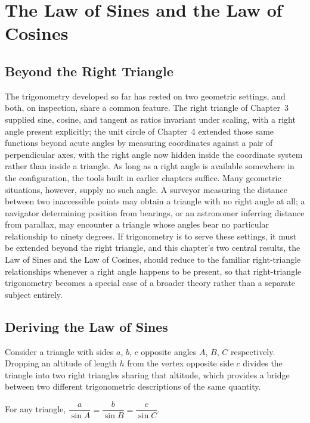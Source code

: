 \chapter{The Law of Sines and the Law of Cosines}
\label{ch:ch12-laws-sines-cosines}

\section{Beyond the Right Triangle}

The trigonometry developed so far has rested on two geometric settings, and
both, on inspection, share a common feature. The right triangle of
Chapter~3 supplied sine, cosine, and tangent as ratios invariant under
scaling, with a right angle present explicitly; the unit circle of
Chapter~4 extended those same functions beyond acute angles by measuring
coordinates against a pair of perpendicular axes, with the right angle now
hidden inside the coordinate system rather than inside a triangle. As long
as a right angle is available somewhere in the configuration, the tools
built in earlier chapters suffice. Many geometric situations, however,
supply no such angle. A surveyor measuring the distance between two
inaccessible points may obtain a triangle with no right angle at all; a
navigator determining position from bearings, or an astronomer inferring
distance from parallax, may encounter a triangle whose angles bear no
particular relationship to ninety degrees. If trigonometry is to serve
these settings, it must be extended beyond the right triangle, and this
chapter's two central results, the Law of Sines and the Law of Cosines,
should reduce to the familiar right-triangle relationships whenever a
right angle happens to be present, so that right-triangle trigonometry
becomes a special case of a broader theory rather than a separate subject
entirely.

\section{Deriving the Law of Sines}

Consider a triangle with sides $a$, $b$, $c$ opposite angles $A$, $B$,
$C$ respectively. Dropping an altitude of length $h$ from the vertex
opposite side $c$ divides the triangle into two right triangles sharing
that altitude, which provides a bridge between two different
trigonometric descriptions of the same quantity.

\begin{theorem}
For any triangle, $\dfrac{a}{\sin A} = \dfrac{b}{\sin B} = \dfrac{c}{\sin
C}$.
\end{theorem}


